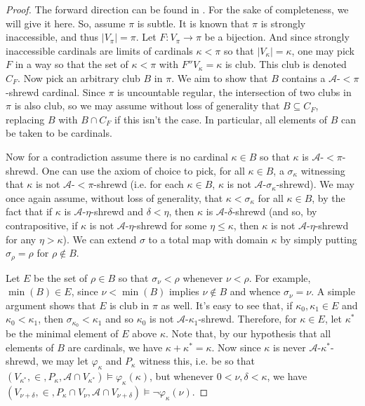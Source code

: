 \documentclass{article}
\theoremstyle{definition}
\theoremstyle{plain}
\theoremstyle{plain}
\theoremstyle{plain}
\theoremstyle{plain}
\theoremstyle{remark}
\theoremstyle{remark}
\theoremstyle{remark}
\theoremstyle{plain}
\theoremstyle{plain}
\theoremstyle{plain}
\begin{document}
\begin{proof}
The forward direction can be found in \cite{rathjen2}. For the sake of completeness, we will give it here. So, assume $\pi$ is subtle. It is known that $\pi$ is strongly inaccessible, and thus $|V_\pi| = \pi$. Let $F: V_\pi \to \pi$ be a bijection. And since strongly inaccessible cardinals are limits of cardinals $\kappa < \pi$ so that $|V_\kappa| = \kappa$, one may pick $F$ in a way so that the set of $\kappa < \pi$ with $F''V_\kappa = \kappa$ is club. This club is denoted $C_F$. Now pick an arbitrary club $B$ in $\pi$. We aim to show that $B$ contains a $\mathcal{A}$-$< \pi$-shrewd cardinal. Since $\pi$ is uncountable regular, the intersection of two clubs in $\pi$ is also club, so we may assume without loss of generality that $B \subseteq C_F$, replacing $B$ with $B \cap C_F$ if this isn't the case. In particular, all elements of $B$ can be taken to be cardinals.

Now for a contradiction assume there is no cardinal $\kappa \in B$ so that $\kappa$ is $\mathcal{A}$-$< \pi$-shrewd. One can use the axiom of choice to pick, for all $\kappa \in B$, a $\sigma_\kappa$ witnessing that $\kappa$ is not $\mathcal{A}$-$< \pi$-shrewd (i.e. for each $\kappa \in B$, $\kappa$ is not $\mathcal{A}$-$\sigma_\kappa$-shrewd). We may once again assume, without loss of generality, that $\kappa < \sigma_\kappa$ for all $\kappa \in B$, by the fact that if $\kappa$ is $\mathcal{A}$-$\eta$-shrewd and $\delta < \eta$, then $\kappa$ is $\mathcal{A}$-$\delta$-shrewd (and so, by contrapositive, if $\kappa$ is not $\mathcal{A}$-$\eta$-shrewd for some $\eta \leq \kappa$, then $\kappa$ is not $\mathcal{A}$-$\eta$-shrewd for any $\eta > \kappa$). We can extend $\sigma$ to a total map with domain $\kappa$ by simply putting $\sigma_\rho = \rho$ for $\rho \notin B$.

Let $E$ be the set of $\rho \in B$ so that $\sigma_\nu < \rho$ whenever $\nu < \rho$. For example, $\min(B) \in E$, since $\nu < \min(B)$ implies $\nu \notin B$ and whence $\sigma_\nu = \nu$. A simple argument shows that $E$ is club in $\pi$ as well. It's easy to see that, if $\kappa_0, \kappa_1 \in E$ and $\kappa_0 < \kappa_1$, then $\sigma_{\kappa_0} < \kappa_1$ and so $\kappa_0$ is not $\mathcal{A}$-$\kappa_1$-shrewd. Therefore, for $\kappa \in E$, let $\kappa^*$ be the minimal element of $E$ above $\kappa$. Note that, by our hypothesis that all elements of $B$ are cardinals, we have $\kappa + \kappa^* = \kappa$. Now since $\kappa$ is never $\mathcal{A}$-$\kappa^*$-shrewd, we may let $\varphi_\kappa$ and $P_\kappa$ witness this, i.e. be so that $(V_{\kappa^*}, \in, P_\kappa, \mathcal{A} \cap V_{\kappa^*}) \models \varphi_\kappa(\kappa)$, but whenever $0 < \nu, \delta < \kappa$, we have $(V_{\nu+\delta}, \in, P_\kappa \cap V_\nu, \mathcal{A} \cap V_{\nu+\delta}) \models \neg \varphi_\kappa(\nu)$.


\end{proof}
\end{document}
